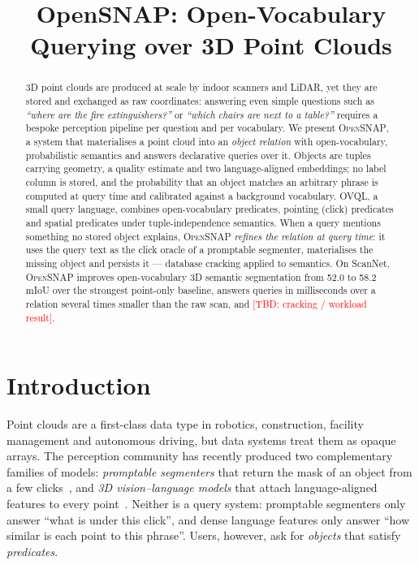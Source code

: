 \documentclass[conference]{IEEEtran}
\newcommand{\TBD}[1]{\textcolor{red}{[TBD: #1]}}
\newcommand{\sys}{\textsc{OpenSNAP}}
\newcommand{\ovql}{\textsc{OVQL}}
\begin{document}
\title{OpenSNAP: Open-Vocabulary Querying over 3D Point Clouds}
\author{\IEEEauthorblockN{\TBD{authors}}\IEEEauthorblockA{\TBD{affiliations}}}
\maketitle

\begin{abstract}
3D point clouds are produced at scale by indoor scanners and LiDAR, yet they are stored and exchanged as raw
coordinates: answering even simple questions such as \emph{``where are the fire extinguishers?''} or
\emph{``which chairs are next to a table?''} requires a bespoke perception pipeline per question and per vocabulary.
We present \sys{}, a system that materialises a point cloud into an \emph{object relation} with open-vocabulary,
probabilistic semantics and answers declarative queries over it. Objects are tuples carrying geometry, a quality
estimate and two language-aligned embeddings; no label column is stored, and the probability that an object matches
an arbitrary phrase is computed at query time and calibrated against a background vocabulary. \ovql{}, a small query
language, combines open-vocabulary predicates, pointing (click) predicates and spatial predicates under
tuple-independence semantics. When a query mentions something no stored object explains, \sys{} \emph{refines the
relation at query time}: it uses the query text as the click oracle of a promptable segmenter, materialises the missing
object and persists it --- database cracking applied to semantics. On ScanNet, \sys{} improves open-vocabulary 3D
semantic segmentation from 52.0 to 58.2 mIoU over the strongest point-only baseline, answers queries in milliseconds
over a relation several times smaller than the raw scan, and \TBD{cracking / workload result}.
\end{abstract}

\section{Introduction}
Point clouds are a first-class data type in robotics, construction, facility management and autonomous driving, but
data systems treat them as opaque arrays. The perception community has recently produced two complementary families of
models: \emph{promptable segmenters} that return the mask of an object from a few clicks~\cite{snap,agile3d,pointsam},
and \emph{3D vision--language models} that attach language-aligned features to every point~\cite{openscene}. Neither is
a query system: promptable segmenters only answer ``what is under this click'', and dense language features only answer
``how similar is each point to this phrase''. Users, however, ask for \emph{objects} that satisfy \emph{predicates}.
\end{document}
